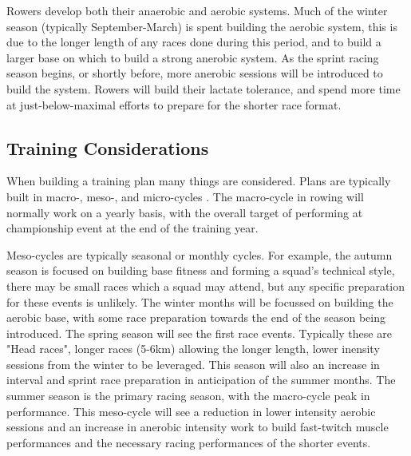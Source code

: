 Rowers develop both their anaerobic and aerobic systems. Much of the winter season (typically September-March) is spent building the aerobic system, this is due to the longer length of any races done during this period, and to build a larger base on which to build a strong anerobic system. As the sprint racing season begins, or shortly before, more anerobic sessions will be introduced to build the system. Rowers will build their lactate tolerance, and spend more time at just-below-maximal efforts to prepare for the shorter race format.


\subsection{Training Considerations}
When building a training plan many things are considered. Plans are typically built in macro-, meso-, and micro-cycles \cite{periodisation}. The macro-cycle in rowing will normally work on a yearly basis, with the overall target of performing at championship event at the end of the training year. 

Meso-cycles are typically seasonal or monthly cycles. For example, the autumn season is focused on building base fitness and forming a squad's technical style, there may be small races which a squad may attend, but any specific preparation for these events is unlikely. The winter months will be focussed on building the aerobic base, with some race preparation towards the end of the season being introduced. The spring season will see the first race events. Typically these are "Head races", longer races (5-6km) allowing the longer length, lower inensity sessions from the winter to be leveraged. This season will also an increase in interval and sprint race preparation in anticipation of the summer months. The summer season is the primary racing season, with the macro-cycle peak in performance. This meso-cycle will see a reduction in lower intensity aerobic sessions and an increase in anerobic intensity work to build fast-twitch muscle performances and the necessary racing performances of the shorter events.

